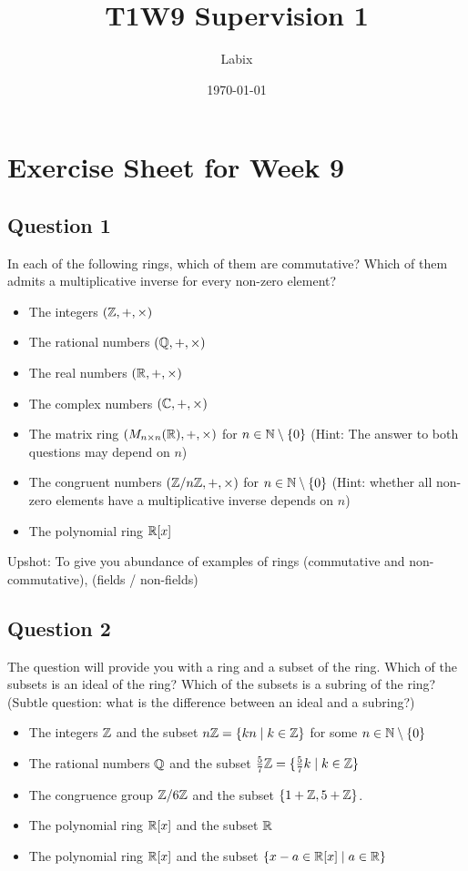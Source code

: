 \documentclass[a4paper]{article}
\title{T1W9 Supervision 1}
\author{Labix}
\date{\today}
\begin{document}
\section*{Exercise Sheet for Week 9}
\subsection*{Question 1}
In each of the following rings, which of them are commutative? Which of them admits a multiplicative inverse for every non-zero element? 
\begin{itemize}
\item The integers $(\mathbb{Z},+,\times)$
\item The rational numbers $(\mathbb{Q},+,\times)$
\item The real numbers $(\mathbb{R},+,\times)$
\item The complex numbers $(\mathbb{C},+,\times)$
\item The matrix ring $(M_{n\times n}(\mathbb{R}),+,\times)$ for $n\in\mathbb{N}\setminus\{0\}$ (Hint: The answer to both questions may depend on $n$)
\item The congruent numbers $(\mathbb{Z}/n\mathbb{Z},+,\times)$ for $n\in\mathbb{N}\setminus\{0\}$ (Hint: whether all non-zero elements have a multiplicative inverse depends on $n$)
\item The polynomial ring $\mathbb{R}[x]$
\end{itemize}

Upshot: To give you abundance of examples of rings (commutative and non-commutative), (fields / non-fields)

\subsection*{Question 2}
The question will provide you with a ring and a subset of the ring. Which of the subsets is an ideal of the ring? Which of the subsets is a subring of the ring? (Subtle question: what is the difference between an ideal and a subring?)

\begin{itemize}
\item The integers $\mathbb{Z}$ and the subset $n\mathbb{Z}=\{kn\;|\;k\in\mathbb{Z}\}$ for some $n\in\mathbb{N}\setminus\{0\}$
\item The rational numbers $\mathbb{Q}$ and the subset $\frac{5}{7}\mathbb{Z}=\{\frac{5}{7}k\;|\;k\in\mathbb{Z}\}$
\item The congruence group $\mathbb{Z}/6\mathbb{Z}$ and the subset $\{1+\mathbb{Z},5+\mathbb{Z}\}$. 
\item The polynomial ring $\mathbb{R}[x]$ and the subset $\mathbb{R}$
\item The polynomial ring $\mathbb{R}[x]$ and the subset $\{x-a\in\mathbb{R}[x]\;|\;a\in\mathbb{R}\}$
\end{itemize}
\end{document}
